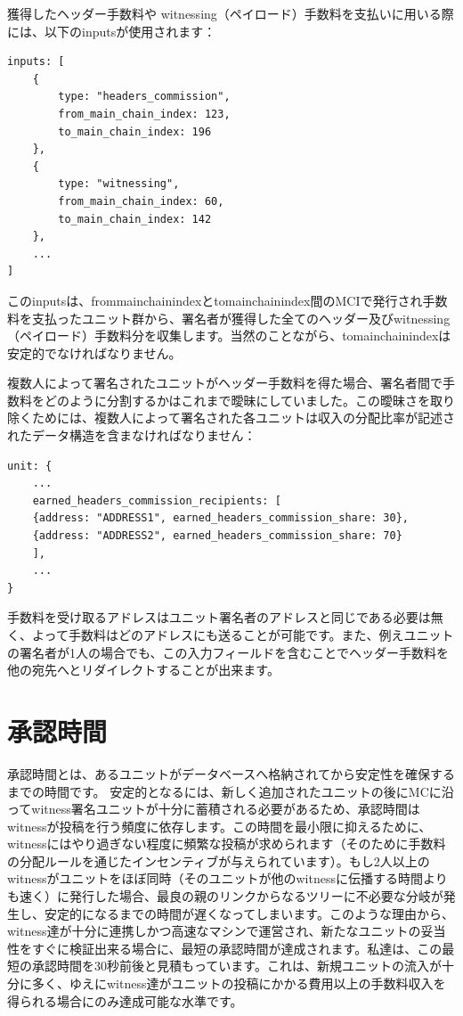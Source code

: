 \documentclass[a4paper, dvipdfmx]{jsarticle}
\begin{document}
獲得したヘッダー手数料や witnessing（ペイロード）手数料を支払いに用いる際には、以下のinputsが使用されます：

\begin{lstlisting}[basicstyle=\ttfamily\footnotesize, frame=none]
inputs: [
    {
        type: "headers_commission",
        from_main_chain_index: 123,
        to_main_chain_index: 196
    },
    {
        type: "witnessing",
        from_main_chain_index: 60,
        to_main_chain_index: 142
    },
    ...
]
\end{lstlisting}

このinputsは、from\textunderscore main\textunderscore chain\textunderscore indexとto\textunderscore main\textunderscore chain\textunderscore index間のMCIで発行され手数料を支払ったユニット群から、署名者が獲得した全てのヘッダー及びwitnessing（ペイロード）手数料分を収集します。当然のことながら、to\textunderscore main\textunderscore chain\textunderscore indexは安定的でなければなりません。

複数人によって署名されたユニットがヘッダー手数料を得た場合、署名者間で手数料をどのように分割するかはこれまで曖昧にしていました。この曖昧さを取り除くためには、複数人によって署名された各ユニットは収入の分配比率が記述されたデータ構造を含まなければなりません：

\begin{lstlisting}[basicstyle=\ttfamily\footnotesize, frame=none]
unit: {
    ...
    earned_headers_commission_recipients: [
    {address: "ADDRESS1", earned_headers_commission_share: 30},
    {address: "ADDRESS2", earned_headers_commission_share: 70}
    ],
    ...
}
\end{lstlisting}

手数料を受け取るアドレスはユニット署名者のアドレスと同じである必要は無く、よって手数料はどのアドレスにも送ることが可能です。また、例えユニットの署名者が1人の場合でも、この入力フィールドを含むことでヘッダー手数料を他の宛先へとリダイレクトすることが出来ます。


\section{承認時間}
承認時間とは、あるユニットがデータベースへ格納されてから安定性を確保するまでの時間です。 安定的となるには、新しく追加されたユニットの後にMCに沿ってwitness署名ユニットが十分に蓄積される必要があるため、承認時間はwitnessが投稿を行う頻度に依存します。この時間を最小限に抑えるために、witnessにはやり過ぎない程度に頻繁な投稿が求められます（そのために手数料の分配ルールを通じたインセンティブが与えられています）。もし2人以上のwitnessがユニットをほぼ同時（そのユニットが他のwitnessに伝播する時間よりも速く）に発行した場合、最良の親のリンクからなるツリーに不必要な分岐が発生し、安定的になるまでの時間が遅くなってしまいます。このような理由から、witness達が十分に連携しかつ高速なマシンで運営され、新たなユニットの妥当性をすぐに検証出来る場合に、最短の承認時間が達成されます。私達は、この最短の承認時間を30秒前後と見積もっています。これは、新規ユニットの流入が十分に多く、ゆえにwitness達がユニットの投稿にかかる費用以上の手数料収入を得られる場合にのみ達成可能な水準です。
\end{document}
